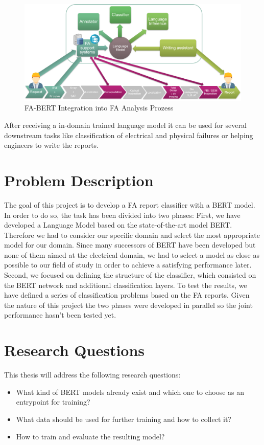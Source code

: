 \begin{figure}[H]
	\centering	\includegraphics[width=1\textwidth]{figures/fa_bert_process.png}
	\caption{FA-BERT Integration into FA Analysis Prozess}
	\label{fig:fa_bert_process}
\end{figure}

After receiving a in-domain trained language model it can be used for several downstream tasks like classification of electrical and physical failures or helping engineers to write the reports.

\section{Problem Description}
The goal of this project is to develop a FA report classifier with a BERT model.
In order to do so, the task has been divided into two phases: \newline
First, we have developed a Language Model based on the state-of-the-art model BERT. Therefore we had to consider our specific domain and select the most appropriate model for our domain. Since many successors of BERT have been developed but none of them aimed at the electrical domain, we had to select a model as close as possible to our field of study in order to achieve a satisfying performance later. \newline
Second, we focused on defining the structure of the classifier, which consisted on the BERT network and additional classification layers. To test the results, we have defined a series of classification problems based on the FA reports. \newline
Given the nature of this project the two phases were developed in parallel so the joint performance hasn't been tested yet. \newline

\section{Research Questions}
This thesis will address the following research questions:
\begin{itemize}
	\item What kind of BERT models already exist and which one to choose as an entrypoint for training?
	\item What data should be used for further training and how to collect it?
	\item How to train and evaluate the resulting model?
\end{itemize}

